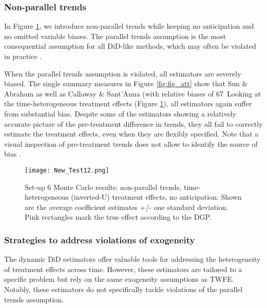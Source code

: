 \subsubsection{Non-parallel trends}

In Figure \ref{fig:fig5}, we introduce non-parallel trends while keeping no anticipation and no omitted variable biases. The parallel trends assumption is the most consequential assumption for all DiD-like methods, which may often be violated in practice \cite{Chiu.2023}. 

When the parallel trends assumption is violated, all estimators are severely biased. The single summary measures in Figure \ref{fig:fig_att} show that Sun \& Abraham as well as Callaway \& Sant'Anna (with relative biases of 67\
Looking at the time-heterogeneous treatment effects (Figure \ref{fig:fig5}), all estimators again suffer from substantial bias. Despite some of the estimators showing a relatively accurate picture of the pre-treatment difference in trends, they all fail to correctly estimate the treatment effects, even when they are flexibly specified. Note that a visual inspection of pre-treatment trends does not allow to identify the source of bias \cite[see also~][]{Roth.2023}.

\begin{figure}[t]    \centering
    \texttt{[image: New\_Test12.png]}
    \caption{Set-up 6 Monte Carlo results: non-parallel trends, time-heterogeneous (inverted-U) treatment effects, no anticipation. Shown are the average coefficient estimates +/- one standard deviation. Pink rectangles mark the true effect according to the DGP.}    \label{fig:fig5}    \hypertarget{fig:fig5}{}\end{figure}

\subsubsection{Strategies to address violations of exogeneity}

The dynamic DiD estimators \cite{Goodman-Bacon.2021, Callaway.2020, Sun.2021, Wooldridge.2021, DeChaisemartin.2020} offer valuable tools for addressing the heterogeneity of treatment effects across time. However, these estimators are tailored to a specific problem but rely on the same exogeneity assumptions as TWFE. Notably, these estimators do not specifically tackle violations of the parallel trends assumption. 

